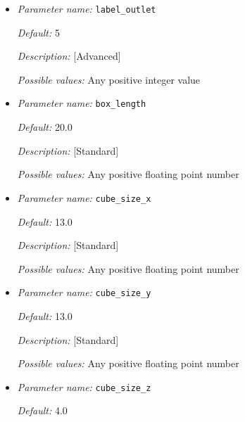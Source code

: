\begin{itemize}
{\it Default:} 4

{\it Description:} [Advanced] 

{\it Possible values:} Any positive integer value 


\item {\it Parameter name:} {\tt label\_outlet}
\label{parameters:label_outlet}


{\it Default:} 5

{\it Description:} [Advanced] 

{\it Possible values:} Any positive integer value 


\item {\it Parameter name:} {\tt box\_length}
\label{parameters:box_length}


{\it Default:} 20.0

{\it Description:} [Standard] 

{\it Possible values:} Any positive floating point number 


\item {\it Parameter name:} {\tt cube\_size\_x}
\label{parameters:cube_size_x}


{\it Default:} 13.0

{\it Description:} [Standard] 

{\it Possible values:} Any positive floating point number 


\item {\it Parameter name:} {\tt cube\_size\_y}
\label{parameters:cube_size_y}


{\it Default:} 13.0

{\it Description:} [Standard] 

{\it Possible values:} Any positive floating point number 


\item {\it Parameter name:} {\tt cube\_size\_z}
\label{parameters:cube_size_z}


{\it Default:} 4.0


\end{itemize}
